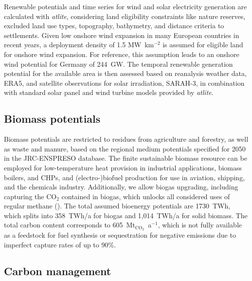 Renewable potentials and time series for wind and solar electricity generation
are calculated with \textit{atlite},\cite{hofmannAtliteLightweight2021}
considering land eligibility constraints like nature reserves, excluded land use
types, topography, bathymetry, and distance criteria to settlements. Given low
onshore wind expansion in many European countries in recent
years,\cite{ourworldindataInstalledWind2023} a deployment density of 1.5
MW~km$^{-2}$ is assumed for eligible land for onshore wind
expansion.\cite{turkovskaLanduseRequirementsSolar2023a} For reference, this
assumption leads to an onshore wind potential for Germany of 244~GW. The
temporal renewable generation potential for the available area is then assessed
based on reanalysis weather data, ERA5,\cite{ecmwf} and satellite observations
for solar irradiation, SARAH-3,\cite{pfeifrothSurfaceRadiationData2023} in
combination with standard solar panel and wind turbine models provided by
\textit{atlite}.

\subsection*{Biomass potentials}

Biomass potentials are restricted to residues from agriculture and forestry, as
well as waste and manure, based on the regional medium potentials specified for
2050 in the JRC-ENSPRESO database.\cite{ruizENSPRESOOpen2019} The finite
sustainable biomass resource can be employed for low-temperature heat provision
in industrial applications, biomass boilers, and CHPs, and (electro-)biofuel
production for use in aviation, shipping, and the chemicals industry.
Additionally, we allow biogas upgrading, including capturing the CO$_2$
contained in biogas, which unlocks all considered uses of regular methane
(). The total assumed bioenergy
potentials are 1730~TWh, which splits into 358~TWh/a for biogas and 1,014~TWh/a
for solid biomass. The total carbon content corresponds to
605~Mt$_{\text{CO}_2}$~a$^{-1}$, which is not fully available as a feedstock for
fuel synthesis or sequestration for negative emissions due to imperfect capture
rates of up to 90\%.

\subsection*{Carbon management}

